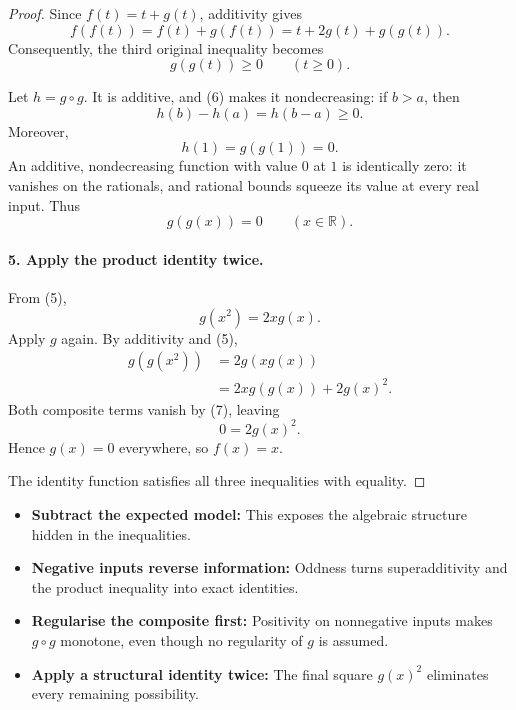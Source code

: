 \begin{dlsummary}[title={\bfseries Solution 59. The Hidden Product Rule},breakable]
\begin{proof}
Since \(f(t)=t+g(t)\), additivity gives
\[
f(f(t))
=f(t)+g(f(t))
=t+2g(t)+g(g(t)).
\]
Consequently, the third original inequality becomes
\[
\boxed{g(g(t))\ge0\qquad(t\ge0).} \tag{6}
\]

Let \(h=g\circ g\). It is additive, and (6) makes it nondecreasing: if \(b>a\), then
\[
h(b)-h(a)=h(b-a)\ge0.
\]
Moreover,
\[
h(1)=g(g(1))=0.
\]
An additive, nondecreasing function with value \(0\) at \(1\) is identically zero: it vanishes on the rationals, and rational bounds squeeze its value at every real input. Thus
\[
\boxed{g(g(x))=0\qquad(x\in\mathbb R).} \tag{7}
\]

\paragraph{5. Apply the product identity twice.}

From (5),
\[
g(x^2)=2xg(x).
\]
Apply \(g\) again. By additivity and (5),
\[
\begin{aligned}
g(g(x^2))
&=2g(xg(x))\\
&=2xg(g(x))+2g(x)^2.
\end{aligned}
\]
Both composite terms vanish by (7), leaving
\[
0=2g(x)^2.
\]
Hence \(g(x)=0\) everywhere, so \(f(x)=x\).

The identity function satisfies all three inequalities with equality.
\end{proof}
\end{dlsummary}

\begin{takeaways}
\begin{itemize}
\item \textbf{Subtract the expected model:} This exposes the algebraic structure hidden in the inequalities.
\item \textbf{Negative inputs reverse information:} Oddness turns superadditivity and the product inequality into exact identities.
\item \textbf{Regularise the composite first:} Positivity on nonnegative inputs makes \(g\circ g\) monotone, even though no regularity of \(g\) is assumed.
\item \textbf{Apply a structural identity twice:} The final square \(g(x)^2\) eliminates every remaining possibility.
\end{itemize}
\end{takeaways}
